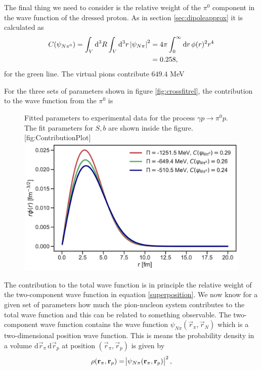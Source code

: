 The final thing we need to consider is the relative weight of the $\pi^0$ component in the wave function of the dressed proton. As in section \ref{sec:dipoleapprox} it is calculated as 
\begin{align}
	C(\psi_{N\pi^0})= \int_V \text{d}^3R \int_V \text{d}^3 r \, \abs{\psi_{N\pi}}^2 &= 4\pi \int_0^\infty \text{d}r \, \phi(r)^2r^4 \\
	&= 0.258, 
\end{align}
for the green line. The virtual pions contribute $649.4$ MeV

For the three sets of parameters shown in figure \ref{fig:crossfitrel}, the contribution to the wave function from the $\pi^0$ is

\begin{figure}[H]
	\begin{sidecaption}{Fitted parameters to experimental data for the process $\gamma p \rightarrow \pi^0 p$. The fit parameters for $S,b$ are shown inside the figure.}[fig:ContributionPlot]
		\includegraphics[width=\linewidth]{Figures/ContributionPlot.pdf} 
	\end{sidecaption}
\end{figure}
The contribution to the total wave function is in principle the relative weight of the two-component wave function in equation \eqref{superposition}. We now know for a given set of parameters how much the pion-nucleon system contributes to the total wave function and this can be related to something observable. The two-component wave function contains the wave function $\psi_{N\pi}(\vec{r}_\pi,\vec{r}_N)$ which is a two-dimensional position wave function. This is means the probability density in a volume $\text{d}\vec{r}_\pi \, \text{d}\vec{r}_p$ at position $(\vec{r}_\pi,\vec{r}_p)$ is given by
\begin{equation}\label{probdens}
 \rho(\bm{\mathrm{r}}_\pi,\bm{\mathrm{r}}_p) = \abs{\psi_{N\pi}(\bm{\mathrm{r}}_\pi,\bm{\mathrm{r}}_p)}^2,
\end{equation}

